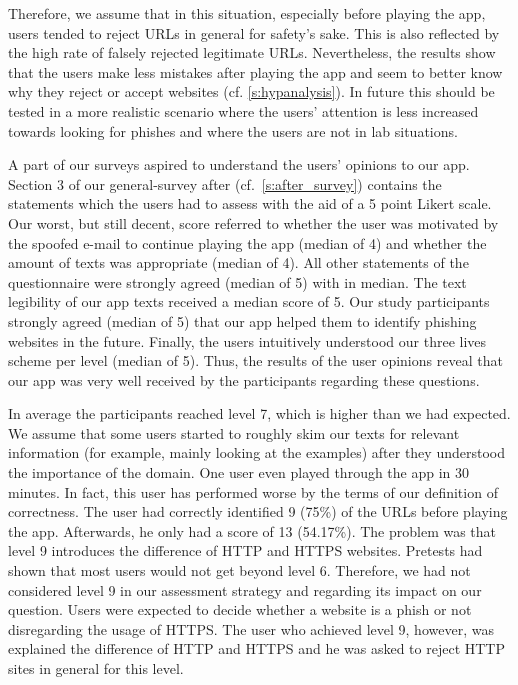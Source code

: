 \begin{description}[leftmargin=0cm]
	Therefore, we assume that in this situation, especially before playing the app, users tended to reject URLs in general for safety's sake.
	This is also reflected by the high rate of falsely rejected legitimate URLs.
	Nevertheless, the results show that the users make less mistakes after playing the app and seem to better know why they reject or accept websites (cf. \autoref{s:hypanalysis}).
	In future this should be tested in a more realistic scenario where the users' attention is less increased towards looking for phishes and where the users are not in lab situations.
	\item[User Opinions to App:] A part of our surveys aspired to understand the users' opinions to our app.
	Section 3 of our general-survey after (cf.~\autoref{s:after_survey}) contains the statements which the users had to assess with the aid of a 5 point Likert scale.
	Our worst, but still decent, score referred to whether the user was motivated by the spoofed e-mail to continue playing the app (median of 4) and whether the amount of texts was appropriate (median of 4).
	All other statements of the questionnaire were strongly agreed (median of 5) with in median.
	The text legibility of our app texts received a median score of 5.
	Our study participants strongly agreed (median of 5) that our app helped them to identify phishing websites in the future.
	Finally, the users intuitively understood our three lives scheme per level (median of 5).
	Thus, the results of the user opinions reveal that our app was very well received by the participants regarding these questions.
	\item[Achieved Levels:] In average the participants reached level 7, which is higher than we had expected.
	We assume that some users started to roughly skim our texts for relevant information (for example, mainly looking at the examples) after they understood the importance of the domain.
	One user even played through the app in 30 minutes.
	In fact, this user has performed worse by the terms of our definition of correctness.
	The user had correctly identified 9 (75\%) of the URLs before playing the app.
	Afterwards, he only had a score of 13 (54.17\%).
	The problem was that level 9 introduces the difference of HTTP and HTTPS websites.
	Pretests had shown that most users would not get beyond level 6. Therefore, we had not considered level 9 in our assessment strategy and regarding its impact on our question.
	Users were expected to decide whether a website is a phish or not disregarding the usage of HTTPS.
	The user who achieved level 9, however, was explained the difference of HTTP and HTTPS and he was asked to reject HTTP sites in general for this level.

\end{description}
